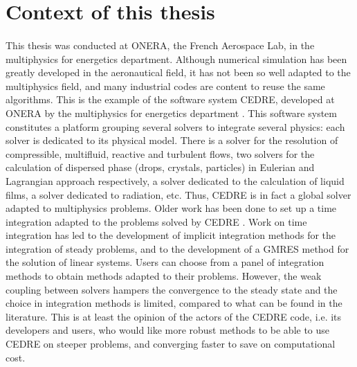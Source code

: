   \section*{Context of this thesis}

    \paragraph{}
    This thesis was conducted at ONERA, the French Aerospace Lab, in the multiphysics for energetics department.
    Although numerical simulation has been greatly developed in the aeronautical field, it has not been so well adapted to the multiphysics field, and many industrial codes are content to reuse the same algorithms.
    This is the example of the software system CEDRE, developed at ONERA by the multiphysics for energetics department \cite{ReflochCourbetMurroneEtAl2011}.
    This software system constitutes a platform grouping several solvers to integrate several physics: each solver is dedicated to its physical model.
    There is a solver for the resolution of compressible, multifluid, reactive and turbulent flows, two solvers for the calculation of dispersed phase (drops, crystals, particles) in Eulerian and Lagrangian approach respectively, a solver dedicated to the calculation of liquid films, a solver dedicated to radiation, etc.
    Thus, CEDRE is in fact a global solver adapted to multiphysics problems.
    Older work has been done to set up a time integration adapted to the problems solved by CEDRE \cite{Selva1998}.
    Work on time integration has led to the development of implicit integration methods for the integration of steady problems, and to the development of a GMRES method for the solution of linear systems.
    Users can choose from a panel of integration methods to obtain methods adapted to their problems.
    However, the weak coupling between solvers hampers the convergence to the steady state and the choice in integration methods is limited, compared to what can be found in the literature.
    This is at least the opinion of the actors of the CEDRE code, i.e. its developers and users, who would like more robust methods to be able to use CEDRE on steeper problems, and converging faster to save on computational cost.

